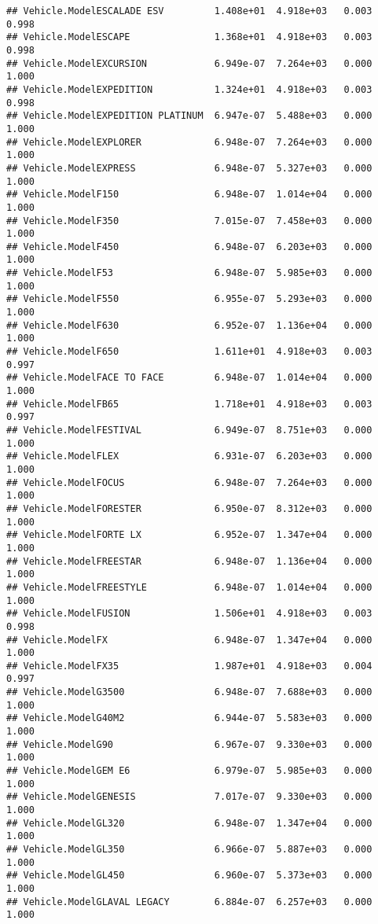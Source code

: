 \documentclass[
]{article}
\begin{document}
\begin{verbatim}
## Vehicle.ModelESCALADE ESV         1.408e+01  4.918e+03   0.003    0.998
## Vehicle.ModelESCAPE               1.368e+01  4.918e+03   0.003    0.998
## Vehicle.ModelEXCURSION            6.949e-07  7.264e+03   0.000    1.000
## Vehicle.ModelEXPEDITION           1.324e+01  4.918e+03   0.003    0.998
## Vehicle.ModelEXPEDITION PLATINUM  6.947e-07  5.488e+03   0.000    1.000
## Vehicle.ModelEXPLORER             6.948e-07  7.264e+03   0.000    1.000
## Vehicle.ModelEXPRESS              6.948e-07  5.327e+03   0.000    1.000
## Vehicle.ModelF150                 6.948e-07  1.014e+04   0.000    1.000
## Vehicle.ModelF350                 7.015e-07  7.458e+03   0.000    1.000
## Vehicle.ModelF450                 6.948e-07  6.203e+03   0.000    1.000
## Vehicle.ModelF53                  6.948e-07  5.985e+03   0.000    1.000
## Vehicle.ModelF550                 6.955e-07  5.293e+03   0.000    1.000
## Vehicle.ModelF630                 6.952e-07  1.136e+04   0.000    1.000
## Vehicle.ModelF650                 1.611e+01  4.918e+03   0.003    0.997
## Vehicle.ModelFACE TO FACE         6.948e-07  1.014e+04   0.000    1.000
## Vehicle.ModelFB65                 1.718e+01  4.918e+03   0.003    0.997
## Vehicle.ModelFESTIVAL             6.949e-07  8.751e+03   0.000    1.000
## Vehicle.ModelFLEX                 6.931e-07  6.203e+03   0.000    1.000
## Vehicle.ModelFOCUS                6.948e-07  7.264e+03   0.000    1.000
## Vehicle.ModelFORESTER             6.950e-07  8.312e+03   0.000    1.000
## Vehicle.ModelFORTE LX             6.952e-07  1.347e+04   0.000    1.000
## Vehicle.ModelFREESTAR             6.948e-07  1.136e+04   0.000    1.000
## Vehicle.ModelFREESTYLE            6.948e-07  1.014e+04   0.000    1.000
## Vehicle.ModelFUSION               1.506e+01  4.918e+03   0.003    0.998
## Vehicle.ModelFX                   6.948e-07  1.347e+04   0.000    1.000
## Vehicle.ModelFX35                 1.987e+01  4.918e+03   0.004    0.997
## Vehicle.ModelG3500                6.948e-07  7.688e+03   0.000    1.000
## Vehicle.ModelG40M2                6.944e-07  5.583e+03   0.000    1.000
## Vehicle.ModelG90                  6.967e-07  9.330e+03   0.000    1.000
## Vehicle.ModelGEM E6               6.979e-07  5.985e+03   0.000    1.000
## Vehicle.ModelGENESIS              7.017e-07  9.330e+03   0.000    1.000
## Vehicle.ModelGL320                6.948e-07  1.347e+04   0.000    1.000
## Vehicle.ModelGL350                6.966e-07  5.887e+03   0.000    1.000
## Vehicle.ModelGL450                6.960e-07  5.373e+03   0.000    1.000
## Vehicle.ModelGLAVAL LEGACY        6.884e-07  6.257e+03   0.000    1.000

\end{verbatim}
\end{document}
